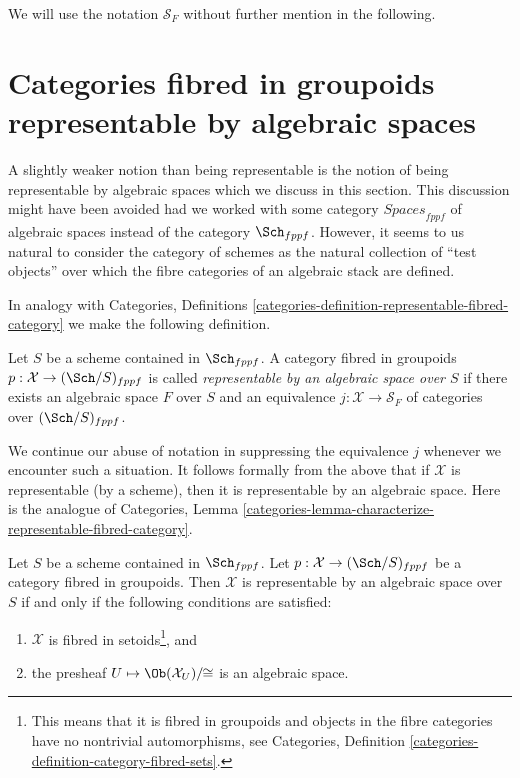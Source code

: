 \medskip\noindent
We will use the notation $\mathcal{S}_F$ without further mention in the
following.




\section{Categories fibred in groupoids representable by algebraic spaces}
\label{section-representable-by-algebraic-spaces}

\noindent
A slightly weaker notion than being representable is the notion of
being representable by algebraic spaces which we discuss in this section.
This discussion might have been avoided had we worked with some category
$\textit{Spaces}_{fppf}$ of algebraic spaces instead of the category
$\Sch_{fppf}$. However, it seems to us natural to consider the
category of schemes as the natural collection of ``test objects'' over
which the fibre categories of an algebraic stack are defined.

\medskip\noindent
In analogy with Categories, Definitions
\ref{categories-definition-representable-fibred-category}
we make the following definition.

\begin{definition}
\label{definition-representable-by-algebraic-space}
Let $S$ be a scheme contained in $\Sch_{fppf}$.
A category fibred in groupoids $p : \mathcal{X} \to (\Sch/S)_{fppf}$
is called {\it representable by an algebraic space over $S$}
if there exists an algebraic space $F$ over $S$ and an equivalence
$j : \mathcal{X} \to \mathcal{S}_F$
of categories over $(\Sch/S)_{fppf}$.
\end{definition}

\noindent
We continue our abuse of notation in suppressing the equivalence $j$
whenever we encounter such a situation.
It follows formally from the above that if $\mathcal{X}$ is
representable (by a scheme), then it is representable by an
algebraic space. Here is the analogue of
Categories,
Lemma \ref{categories-lemma-characterize-representable-fibred-category}.

\begin{lemma}
\label{lemma-characterize-representable-by-space}
Let $S$ be a scheme contained in $\Sch_{fppf}$.
Let $p : \mathcal{X} \to (\Sch/S)_{fppf}$
be a category fibred in groupoids.
Then $\mathcal{X}$ is representable by an algebraic space over $S$
if and only if the following conditions are satisfied:
\begin{enumerate}
\item $\mathcal{X}$ is fibred in setoids\footnote{This means that
it is fibred in groupoids and objects in the fibre categories
have no nontrivial automorphisms, see Categories,
Definition \ref{categories-definition-category-fibred-sets}.}, and
\item the presheaf $U \mapsto \Ob(\mathcal{X}_U)/\!\!\cong$ is
an algebraic space.
\end{enumerate}
\end{lemma}

